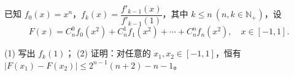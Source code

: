\begin{question}
已知 $f_0(x)=x^n$，$f_k(x)=\dfrac{f'_{k-1}(x)}{f'_{k-1}(1)}$，其中 $k\leq n\ (n,k\in\mathbb N_+)$，设
\nopagebreak[4]
\[
F(x)=C_n^0f_0(x^2)+C_n^1f_1(x^2)+\cdots+C_n^nf_n(x^2),\quad x\in[-1,1].
\]

(1) 写出 $f_k(1)$；
(2) 证明：对任意的 $x_1,x_2\in[-1,1]$，恒有 $|F(x_1)-F(x_2)|\leq2^{n-1}(n+2)-n-1$。

\end{question}